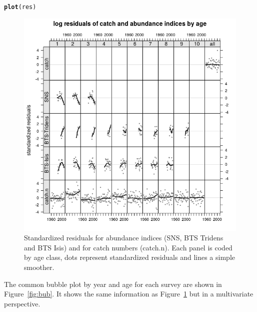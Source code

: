 \documentclass[a4paper,english,10pt]{article}\usepackage[]{graphicx}\usepackage[]{color}
\makeatletter
\def\maxwidth{ %
  \ifdim\Gin@nat@width>\linewidth
    \linewidth
  \else
    \Gin@nat@width
  \fi
}
\newcommand{\hlstd}[1]{\textcolor[rgb]{0.345,0.345,0.345}{#1}}%
\newcommand{\hlkwd}[1]{\textcolor[rgb]{0.737,0.353,0.396}{\textbf{#1}}}%
\newenvironment{kframe}{%
 \def\at@end@of@kframe{}%
 \ifinner\ifhmode%
  \def\at@end@of@kframe{\end{minipage}}%
  \begin{minipage}{\columnwidth}%
 \fi\fi%
 \def\FrameCommand##1{\hskip\@totalleftmargin \hskip-\fboxsep
 \colorbox{shadecolor}{##1}\hskip-\fboxsep
     \hskip-\linewidth \hskip-\@totalleftmargin \hskip\columnwidth}%
 \MakeFramed {\advance\hsize-\width
   \@totalleftmargin\z@ \linewidth\hsize
   \@setminipage}}%
 {\par\unskip\endMakeFramed%
 \at@end@of@kframe}
\newenvironment{knitrout}{}{} %
\makeatother
\begin{document}
\begin{knitrout}
\color{fgcolor}\begin{kframe}
\begin{alltt}
\hlkwd{plot}\hlstd{(res)}
\end{alltt}
\end{kframe}\begin{figure}[H]

{\centering \includegraphics[width=\maxwidth]{figure/res-1} 

}

\caption[Standardized residuals for abundance indices (SNS, BTS Tridens and BTS Isis) and for catch numbers (catch.n)]{Standardized residuals for abundance indices (SNS, BTS Tridens and BTS Isis) and for catch numbers (catch.n). Each panel is coded by age class, dots represent standardized residuals and lines a simple smoother.}\label{fig:res}
\end{figure}


\end{knitrout}

The common bubble plot by year and age for each survey are shown in Figure~\ref{fig:bub}. It shows the same information as Figure~\ref{fig:res} but in a multivariate perspective.
\end{document}
